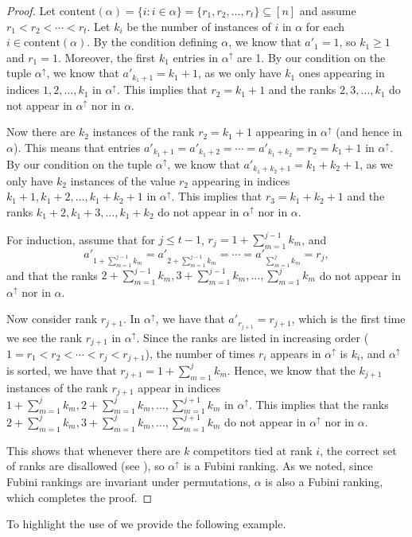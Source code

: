 \documentclass{amsart}
\theoremstyle{definition}
\theoremstyle{definition}
\theoremstyle{remark}
\begin{document}
\begin{proof}
     
    Let $\textrm{content}(\alpha)=\{i: i\in \alpha\}=\{r_1,r_2,\ldots,r_t\}\subseteq[n]$ and assume 
    $r_1<r_2<\cdots<r_t$.
    Let $k_i$ be the number of instances of $i$ in $\alpha$ for each $i\in \textrm{content}(\alpha)$.
    By the condition defining $\alpha$, we know that $a'_1 = 1$, so $k_1 \geq 1$ and $r_1=1$.
    Moreover, the first $k_1$ entries in $\alpha^\uparrow$ are 1. 
    By our condition on the tuple $\alpha^\uparrow$, we know that 
    $a'_{k_1+1}=k_1+1$, as we only have $k_1$ ones appearing in indices $1,2,\ldots, k_1$ in $\alpha^\uparrow$.
This implies that $r_2=k_1+1$ and the ranks $2,3,\ldots,k_1$ do not appear in $\alpha^\uparrow$ nor in $\alpha$.


    Now there are $k_2$ instances of the rank $r_2=k_1+1$ appearing in $\alpha^\uparrow$ (and hence in $\alpha$).
    This means that entries $a'_{k_1+1}=a'_{k_1+2}=\cdots=a'_{k_1+k_2}=r_2=k_1+1$ in 
    $\alpha^{\uparrow}$.
    By our condition on the tuple $\alpha^\uparrow$, we know that 
    $a'_{k_1+k_2+1}=k_1+k_2+1$, as we only have $k_2$ instances of the value $r_2$ appearing in indices $k_1+1,k_1+2,\ldots, k_1+k_2+1$ in $\alpha^\uparrow$.
    This implies that $r_3=k_1+k_2+1$ and the ranks $k_1+2,k_1+3,\ldots,k_1+k_2$ do not appear in $\alpha^\uparrow$ nor in $\alpha$.

    For induction, assume that for $j\leq t-1$, $r_{j}=1+\sum_{m=1}^{j-1}k_m$, and 
    \[a'_{1+\sum_{m=1}^{j-1}k_m}=a'_{2+\sum_{m=1}^{j-1}k_m}=\cdots=a'_{\sum_{m=1}^{j}k_m}=r_j,\]
    and that the ranks $2+\sum_{m=1}^{j-1}k_m,3+\sum_{m=1}^{j-1}k_m,\ldots,\sum_{m=1}^{j}k_m$ do not appear in $\alpha^\uparrow$ nor in $\alpha$.

    Now consider rank $r_{j+1}$.
    In $\alpha^\uparrow$, we have that $a'_{r_{j+1}}=r_{j+1}$, which is the first time we see the rank $r_{j+1}$ in $\alpha^\uparrow$.
    Since the ranks are listed in increasing order ($1=r_1<r_2<\cdots<r_j<r_{j+1}$), the number of times $r_i$ appears in $\alpha^\uparrow$ is $k_i$, and $\alpha^\uparrow$ is sorted, we have that $r_{j+1}=1+\sum_{m=1}^{j}k_m$.
    Hence, we know that the $k_{j+1}$ instances of the rank $r_{j+1}$ appear in indices $1+\sum_{m=1}^{j}k_m,2+\sum_{m=1}^{j}k_m,\ldots, \sum_{m=1}^{j+1}k_m$ in $\alpha^\uparrow$.
    This implies that the ranks $2+\sum_{m=1}^{j}k_m,3+\sum_{m=1}^{j}k_m,\ldots,\sum_{m=1}^{j+1}k_m$ do not appear in $\alpha^\uparrow$ nor in $\alpha$.
    
    
    This shows that whenever there are $k$ competitors tied at rank $i$, the correct set of ranks are disallowed (see ), so $\alpha^\uparrow $ is a Fubini ranking. 
    As we noted, since Fubini rankings are invariant under permutations, $\alpha$ is also a Fubini ranking, which completes the proof.
\end{proof}
To highlight the use of  we provide the following example.
\end{document}
